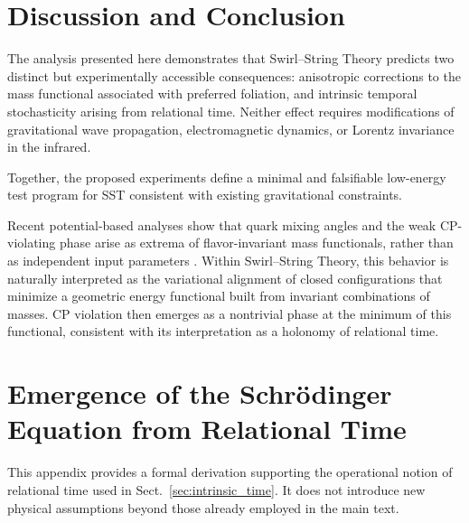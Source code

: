 \documentclass[11pt]{article}
\begin{document}
    \section{Discussion and Conclusion}

        The analysis presented here demonstrates that Swirl--String Theory
        predicts two distinct but experimentally accessible consequences:
        anisotropic corrections to the mass functional associated with preferred
        foliation, and intrinsic temporal stochasticity arising from relational time.
        Neither effect requires modifications of gravitational wave propagation,
        electromagnetic dynamics, or Lorentz invariance in the infrared.

        Together, the proposed experiments define a minimal and falsifiable low-energy test
        program for SST consistent with existing gravitational constraints.

        Recent potential-based analyses show that quark mixing angles and the weak
        CP-violating phase arise as extrema of flavor-invariant mass functionals,
        rather than as independent input parameters \cite{Altshuler2023Potential}.
        Within Swirl--String Theory, this behavior is naturally interpreted as the
        variational alignment of closed configurations that minimize a geometric
        energy functional built from invariant combinations of masses.
        CP violation then emerges as a nontrivial phase at the minimum of this
        functional, consistent with its interpretation as a holonomy of relational
        time.

%
%
\appendix

    \section{Emergence of the Schr\"odinger Equation from Relational Time}
        \label{sec:SST65_schrodinger}

        This appendix provides a formal derivation supporting the operational
        notion of relational time used in Sect.~\ref{sec:intrinsic_time}.
        It does not introduce new physical assumptions beyond those already
        employed in the main text.
\end{document}
